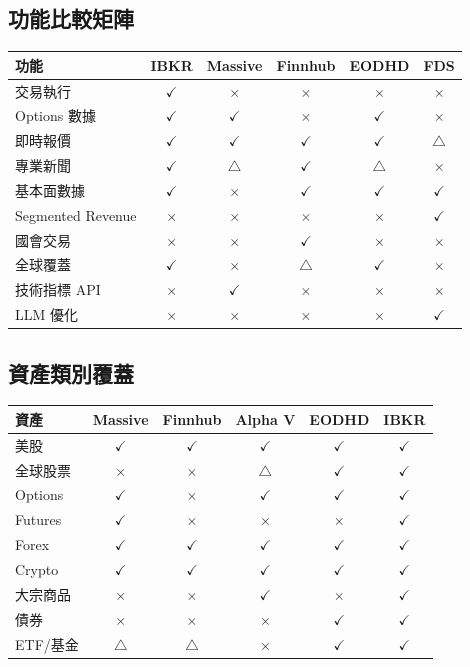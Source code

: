 \documentclass[11pt,a4paper]{article}
\newcommand{\cmark}{\textcolor{successgreen}{$\checkmark$}}
\newcommand{\xmark}{\textcolor{dangered}{$\times$}}
\newcommand{\wmark}{\textcolor{warningyellow}{$\triangle$}}
\begin{document}
\subsection{功能比較矩陣}

\begin{table}[H]
\centering
\begin{tabular}{@{}lccccc@{}}
\toprule
\textbf{功能} & \textbf{IBKR} & \textbf{Massive} & \textbf{Finnhub} & \textbf{EODHD} & \textbf{FDS} \\
\midrule
交易執行 & \cmark & \xmark & \xmark & \xmark & \xmark \\
Options 數據 & \cmark & \cmark & \xmark & \cmark & \xmark \\
即時報價 & \cmark & \cmark & \cmark & \cmark & \wmark \\
專業新聞 & \cmark & \wmark & \cmark & \wmark & \xmark \\
基本面數據 & \cmark & \xmark & \cmark & \cmark & \cmark \\
Segmented Revenue & \xmark & \xmark & \xmark & \xmark & \cmark \\
國會交易 & \xmark & \xmark & \cmark & \xmark & \xmark \\
全球覆蓋 & \cmark & \xmark & \wmark & \cmark & \xmark \\
技術指標 API & \xmark & \cmark & \xmark & \xmark & \xmark \\
LLM 優化 & \xmark & \xmark & \xmark & \xmark & \cmark \\
\bottomrule
\end{tabular}
\end{table}

\subsection{資產類別覆蓋}

\begin{table}[H]
\centering
\begin{tabular}{@{}lccccc@{}}
\toprule
\textbf{資產} & \textbf{Massive} & \textbf{Finnhub} & \textbf{Alpha V} & \textbf{EODHD} & \textbf{IBKR} \\
\midrule
美股 & \cmark & \cmark & \cmark & \cmark & \cmark \\
全球股票 & \xmark & \xmark & \wmark & \cmark & \cmark \\
Options & \cmark & \xmark & \cmark & \cmark & \cmark \\
Futures & \cmark & \xmark & \xmark & \xmark & \cmark \\
Forex & \cmark & \cmark & \cmark & \cmark & \cmark \\
Crypto & \cmark & \cmark & \cmark & \cmark & \cmark \\
大宗商品 & \xmark & \xmark & \cmark & \xmark & \cmark \\
債券 & \xmark & \xmark & \xmark & \cmark & \cmark \\
ETF/基金 & \wmark & \wmark & \xmark & \cmark & \cmark \\
\bottomrule
\end{tabular}
\end{table}
\end{document}
